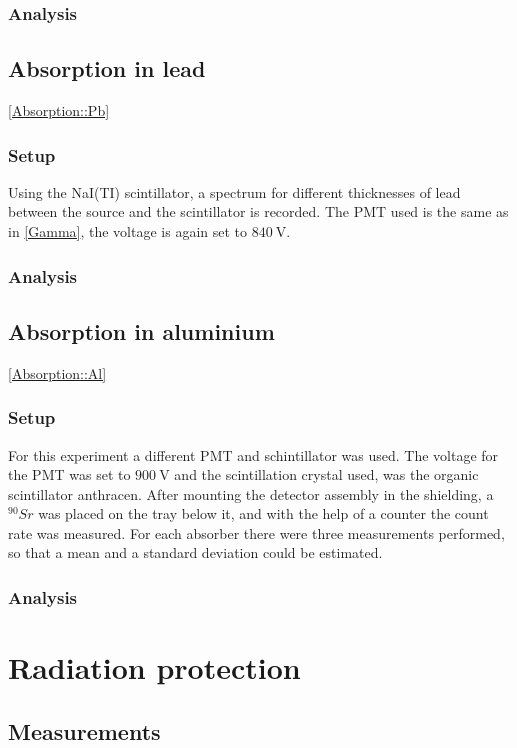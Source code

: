 \documentclass[12pt,twoside,a4paper]{scrartcl}
\begin{document}
		\subsubsection{Analysis}


	\subsection{Absorption in lead}
	\ref{Absorption::Pb}
		\subsubsection{Setup}
			Using the NaI(TI) scintillator, a spectrum for different thicknesses of lead between the source and the scintillator is recorded. The PMT used is the same as in \ref{Gamma}, the voltage is again set to $\SI{840}{\volt}$.

		\subsubsection{Analysis}


	\subsection{Absorption in aluminium}
	\ref{Absorption::Al}
		\subsubsection{Setup}
				For this experiment a different PMT and schintillator was used. The voltage for the PMT was set to $\SI{900}{\volt}$ and the scintillation crystal used, was the organic scintillator anthracen. After mounting the detector assembly in the shielding, a $^{90}Sr$ was placed on the tray below it, and with the help of a counter the count rate was measured. For each absorber there were three measurements performed, so that a mean and a standard deviation could be estimated.

		\subsubsection{Analysis}

	\section{Radiation protection}

	\subsection{Measurements}
\end{document}
